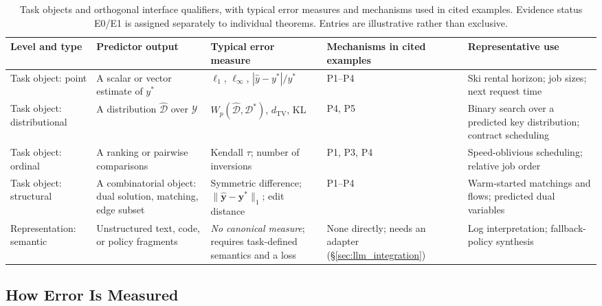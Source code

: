 \documentclass[acmsmall,screen,nonacm]{acmart}
\theoremstyle{acmdefinition}%
\begin{document}
\begin{table}[t!]
\centering
\setlength{\tabcolsep}{3pt}
\caption{Task objects and orthogonal interface qualifiers, with typical error measures and mechanisms used in cited examples. Evidence status E0/E1 is assigned separately to individual theorems. Entries are illustrative rather than exclusive.}
\label{tab:predtypes}
\footnotesize
\begin{tabular}{@{}
    >{\raggedright\arraybackslash}p{1.73cm}
    >{\raggedright\arraybackslash}p{2.89cm}
    >{\raggedright\arraybackslash}p{2.81cm}
    >{\raggedright\arraybackslash}p{2.47cm}
    >{\raggedright\arraybackslash}p{2.81cm}
@{}}
\toprule
\textbf{Level and type} & \textbf{Predictor output} & \textbf{Typical error measure} & \textbf{Mechanisms in cited examples} & \textbf{Representative use} \\
\midrule
Task object: point
& A scalar or vector estimate of $y^*$
& $\ell_1$, $\ell_\infty$, $|\hat{y}-y^*|/y^*$
& P1--P4
& Ski rental horizon; job sizes; next request time~\cite{purohit2018improving,lykouris2018competitive} \\
\addlinespace[1pt]
Task object: distributional
& A distribution $\hat{\mathcal{D}}$ over $\mathcal{Y}$
& $W_p(\hat{\mathcal{D}}, \mathcal{D}^*)$, $d_{\mathrm{TV}}$, KL
& P4, P5
& Binary search over a predicted key distribution; contract scheduling~\cite{dinitz2024binarysearch,angelopoulos2024distributional} \\
\addlinespace[1pt]
Task object: ordinal
& A ranking or pairwise comparisons
& Kendall $\tau$; number of inversions
& P1, P3, P4
& Speed-oblivious scheduling; relative job order~\cite{lindermayr2023speed} \\
\addlinespace[1pt]
Task object: structural
& A combinatorial object: dual solution, matching, edge subset
& Symmetric difference; $\|\hat{\mathbf{y}} - \mathbf{y}^*\|_1$; edit distance
& P1--P4
& Warm-started matchings and flows; predicted dual variables~\cite{dinitz2021duals,lavastida2021instancerobust,davies2023flows} \\
\addlinespace[1pt]
Representation: semantic
& Unstructured text, code, or policy fragments
& \emph{No canonical measure}; requires task-defined semantics and a loss
& None directly; needs an adapter (\S\ref{sec:llm_integration})
& Log interpretation; fallback-policy synthesis \\
\bottomrule
\end{tabular}
\end{table}

\subsection{How Error Is Measured}
\label{subsec:errmeasures}
\end{document}
